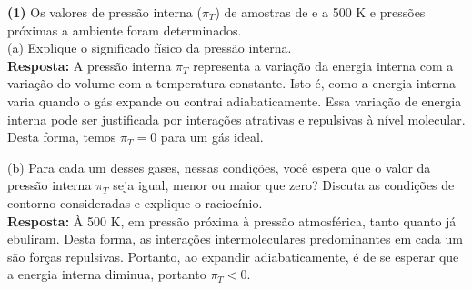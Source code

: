 \textbf{(1)} Os valores de pressão interna (\(\pi_T\)) de amostras de  e
 a 500 K e pressões próximas a ambiente foram determinados.\\

(a) Explique o significado físico da pressão interna.\\

   \textbf{Resposta:} A pressão interna \( \pi_T \) representa a variação da
   energia interna com a variação do volume com a temperatura constante. Isto é,
   como a energia interna varia quando o gás expande ou contrai adiabaticamente.
   Essa variação de energia interna pode ser justificada por interações
   atrativas e repulsivas à nível molecular. Desta forma, temos \( \pi_T = 0 \) para
   um gás ideal. 

(b) Para cada um desses gases, nessas condições, você espera que o valor da
pressão interna \(\pi_T\)  seja igual, menor ou maior que zero? Discuta as
condições de contorno consideradas e explique o raciocínio.\\

    \textbf{Resposta:} À 500 K, em pressão próxima à pressão atmosférica, tanto
     quanto  já ebuliram. Desta forma, as interações
    intermoleculares predominantes em cada um são forças repulsivas.  Portanto,
    ao expandir adiabaticamente, é de se esperar que a energia interna diminua,
    portanto \( \pi_T < 0 \).  

